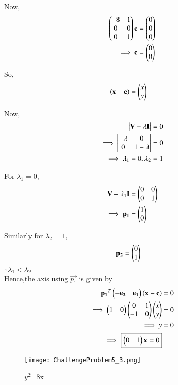 \documentclass[journal,12pt,twocolumn]{IEEEtran}
\begin{document}
\begin{enumerate}
    Now,
    \begin{align}
    \begin{pmatrix}-8 & 1 \\ 0 & 0 \\ 0 & 1\end{pmatrix}\mathbf{c} &= \begin{pmatrix}0 \\ 0 \\ 0\end{pmatrix}
    \\
    \implies \mathbf{c} &= \begin{pmatrix}0 \\ 0\end{pmatrix}
    \end{align}
    
    So,
    \begin{align}
    \left(\mathbf{x}-\mathbf{c}\right) &= \begin{pmatrix}x \\ y\end{pmatrix}
    \end{align}
    
    Now,
    \begin{align}
        \begin{vmatrix}\mathbf{V}-\lambda\mathbf{I}\end{vmatrix} &= 0 \\
        \implies \begin{vmatrix}-\lambda & 0 \\ 0 & 1-\lambda\end{vmatrix} &= 0 \\
        \implies \lambda_1 =0,\lambda_2 &= 1
    \end{align}
    
    For $\lambda_1=0$,
    \begin{align}
        \mathbf{V}-\lambda_1\mathbf{I} &= \begin{pmatrix}0 & 0 \\ 0 & 1\end{pmatrix} \\
        \implies \mathbf{p_1} &= \begin{pmatrix}1 \\ 0\end{pmatrix}
    \end{align}
    
    Similarly for $\lambda_2=1$,
    \begin{align}
        \mathbf{p_2} &=\begin{pmatrix}0 \\ 1\end{pmatrix}
    \end{align}
    $\because \lambda_1<\lambda_2$ \\
    Hence,the axis using $\vec{p_1}$ is given by
    \begin{align}
        \mathbf{p_1}^T\begin{pmatrix}-\mathbf{e_2} & \mathbf{e_1}\end{pmatrix}\left(\mathbf{x}-\mathbf{c}\right) &= 0 \\
        \implies \begin{pmatrix}1 & 0\end{pmatrix}\begin{pmatrix}0 & 1 \\ -1 & 0\end{pmatrix}\begin{pmatrix}x \\ y\end{pmatrix} &= 0 \\
        \implies y &= 0\\
        \implies \boxed{\begin{pmatrix}0 & 1\end{pmatrix}\mathbf{x} =0}
    \end{align}
    
    \begin{figure}[!ht]
    \centering
    \texttt{[image: ChallengeProblem5\_3.png]}
    \caption{$y^2$=8x}
    \label{ex3}	
    \end{figure}
    

\end{enumerate}
\end{document}
